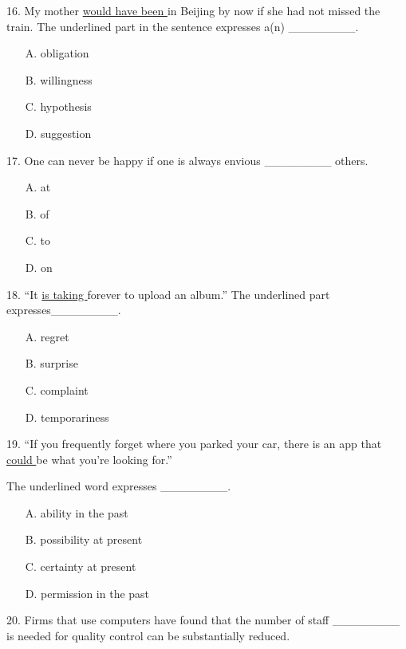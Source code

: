 \documentclass[UTF8,11pt]{ctexart}
\begin{document}
16. My mother \uline{would have been }in Beijing by now if she had not missed the train. The underlined part in the sentence expresses a(n) \_\_\_\_\_\_\_\_.


\begin{itemize}[leftmargin=2em,itemsep=.2em,topsep=.4em]\item[A.] obligation
\item[B.] willingness
\item[C.] hypothesis
\item[D.] suggestion
\end{itemize}

17. One can never be happy if one is always envious \_\_\_\_\_\_\_\_ others.


\begin{itemize}[leftmargin=2em,itemsep=.2em,topsep=.4em]\item[A.] at
\item[B.] of
\item[C.] to
\item[D.] on
\end{itemize}

18. “It \uline{is taking }forever to upload an album.” The underlined part expresses\_\_\_\_\_\_\_\_.


\begin{itemize}[leftmargin=2em,itemsep=.2em,topsep=.4em]\item[A.] regret
\item[B.] surprise
\item[C.] complaint
\item[D.] temporariness
\end{itemize}

19. “If you frequently forget where you parked your car, there is an app that \uline{could }be what you’re looking for.”


The underlined word expresses \_\_\_\_\_\_\_\_.


\begin{itemize}[leftmargin=2em,itemsep=.2em,topsep=.4em]\item[A.] ability in the past
\item[B.] possibility at present
\item[C.] certainty at present
\item[D.] permission in the past
\end{itemize}

20. Firms that use computers have found that the number of staff \_\_\_\_\_\_\_\_ is needed for quality control can be substantially reduced.
\end{document}
